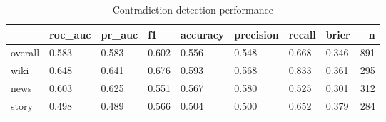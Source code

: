 \begin{table}
\caption{Contradiction detection performance}
\label{tab:results}
\begin{tabular}{llllllllr}
\toprule
 & roc_auc & pr_auc & f1 & accuracy & precision & recall & brier & n \\
\midrule
overall & 0.583 & 0.583 & 0.602 & 0.556 & 0.548 & 0.668 & 0.346 & 891 \\
wiki & 0.648 & 0.641 & 0.676 & 0.593 & 0.568 & 0.833 & 0.361 & 295 \\
news & 0.603 & 0.625 & 0.551 & 0.567 & 0.580 & 0.525 & 0.301 & 312 \\
story & 0.498 & 0.489 & 0.566 & 0.504 & 0.500 & 0.652 & 0.379 & 284 \\
\bottomrule
\end{tabular}
\end{table}
